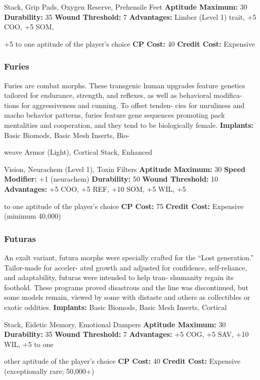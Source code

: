 Stack, Grip Pads, Oxygen Reserve, Prehensile Feet
\textbf{Aptitude Maximum: }30
\textbf{Durability: }35
\textbf{Wound Threshold: }7
\textbf{Advantages:} Limber (Level 1) trait, +5 COO, +5 SOM, 

+5 to one aptitude of the player's choice
\textbf{CP Cost: }40
\textbf{Credit Cost: }Expensive

\subsubsection{Furies}

Furies are combat morphs. These transgenic human 
upgrades feature genetics tailored for endurance, 
strength, and reflexes, as well as behavioral modifica-
tions for aggressiveness and cunning. To offset tenden-
cies for unruliness and macho behavior patterns, furies 
feature gene sequences promoting pack mentalities and 
cooperation, and they tend to be biologically female.
\textbf{Implants:  }Basic Biomods, Basic Mesh Inserts, Bio-

weave Armor (Light), Cortical Stack, Enhanced 

Vision, Neurachem (Level 1), Toxin Filters
\textbf{Aptitude Maximum: }30
\textbf{Speed Modifier: }+1 (neurachem)
\textbf{Durability:} 50
\textbf{Wound Threshold:} 10
\textbf{Advantages:} +5 COO, +5 REF, +10 SOM, +5 WIL, +5 

to one aptitude of the player's choice
\textbf{CP Cost:} 75
\textbf{Credit Cost: }Expensive (minimum 40,000)

\subsubsection{Futuras}

An exalt variant, futura morphs were specially crafted 
for the ``Lost generation.'' Tailor-made for acceler-
ated growth and adjusted for confidence, self-reliance, 
and adaptability, futuras were intended to help tran-
shumanity regain its foothold. These programs proved 
disastrous and the line was discontinued, but some 
models remain, viewed by some with distaste and 
others as collectibles or exotic oddities.
\textbf{Implants: }Basic Biomods, Basic Mesh Inserts, Cortical 

Stack, Eidetic Memory, Emotional Dampers
\textbf{Aptitude Maximum: }30
\textbf{Durability:} 35
\textbf{Wound Threshold: }7
\textbf{Advantages: }+5 COG, +5 SAV, +10 WIL, +5 to one 

other aptitude of the player's choice
\textbf{CP Cost: }40
\textbf{Credit Cost: }Expensive (exceptionally rare; 50,000+)

